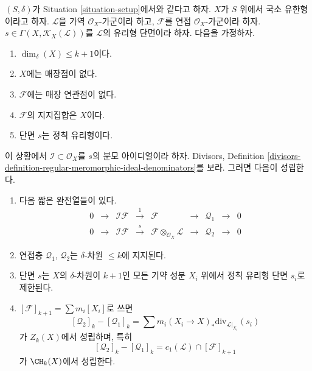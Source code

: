 \begin{lemma}
\label{lemma-no-embedded-points}
$(S, \delta)$가 Situation \ref{situation-setup}에서와 같다고 하자.
$X$가 $S$ 위에서 국소 유한형이라고 하자.
$\mathcal{L}$을 가역 $\mathcal{O}_X$-가군이라 하고,
$\mathcal{F}$를 연접 $\mathcal{O}_X$-가군이라 하자.
$s \in \Gamma(X, \mathcal{K}_X(\mathcal{L}))$를 $\mathcal{L}$의
유리형 단면이라 하자. 다음을 가정하자.
\begin{enumerate}
\item $\dim_\delta(X) \leq k + 1$이다.
\item $X$에는 매장점이 없다.
\item $\mathcal{F}$에는 매장 연관점이 없다.
\item $\mathcal{F}$의 지지집합은 $X$이다.
\item 단면 $s$는 정칙 유리형이다.
\end{enumerate}
이 상황에서 $\mathcal{I} \subset \mathcal{O}_X$를 $s$의 분모
아이디얼이라 하자. Divisors,
Definition \ref{divisors-definition-regular-meromorphic-ideal-denominators}를
보라. 그러면 다음이 성립한다.
\begin{enumerate}
\item 다음 짧은 완전열들이 있다.
$$
\begin{matrix}
0 &
\to &
\mathcal{I}\mathcal{F} &
\xrightarrow{1} &
\mathcal{F} &
\to &
\mathcal{Q}_1 &
\to &
0 \\
0 &
\to &
\mathcal{I}\mathcal{F} &
\xrightarrow{s} &
\mathcal{F} \otimes_{\mathcal{O}_X} \mathcal{L} &
\to &
\mathcal{Q}_2 &
\to &
0
\end{matrix}
$$
\item 연접층 $\mathcal{Q}_1$, $\mathcal{Q}_2$는 $\delta$-차원
$\leq k$에 지지된다.
\item 단면 $s$는 $X$의 $\delta$-차원이 $k + 1$인 모든 기약 성분
$X_i$ 위에서 정칙 유리형 단면 $s_i$로 제한된다.
\item $[\mathcal{F}]_{k + 1} = \sum m_i[X_i]$로 쓰면
$$
[\mathcal{Q}_2]_k - [\mathcal{Q}_1]_k
=
\sum m_i(X_i \to X)_*\text{div}_{\mathcal{L}|_{X_i}}(s_i)
$$
가 $Z_k(X)$에서 성립하며, 특히
$$
[\mathcal{Q}_2]_k - [\mathcal{Q}_1]_k
=
c_1(\mathcal{L}) \cap [\mathcal{F}]_{k + 1}
$$
가 $\CH_k(X)$에서 성립한다.
\end{enumerate}
\end{lemma}

